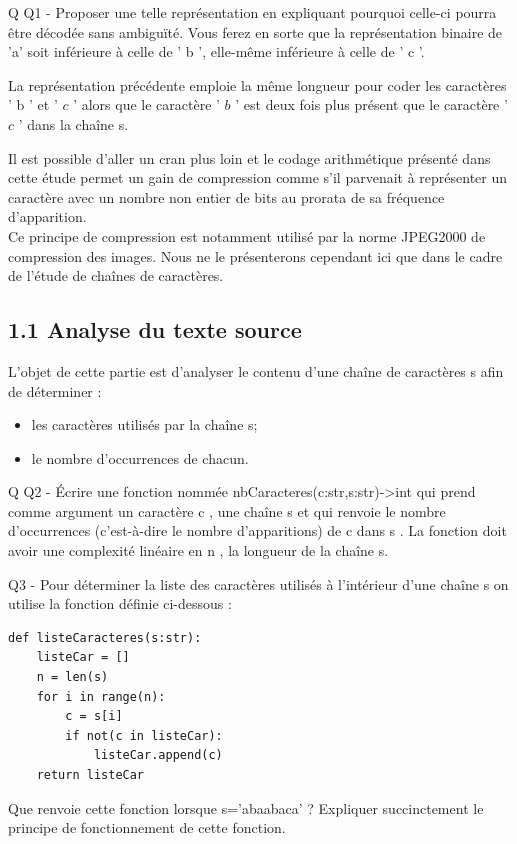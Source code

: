 \documentclass[10pt]{article}
\begin{document}
Q Q1 - Proposer une telle représentation en expliquant pourquoi celle-ci pourra être décodée sans ambiguïté. Vous ferez en sorte que la représentation binaire de 'a' soit inférieure à celle de ' b ', elle-même inférieure à celle de ' c '.

La représentation précédente emploie la même longueur pour coder les caractères ' b ' et ' $c$ ' alors que le caractère ' $b$ ' est deux fois plus présent que le caractère ' $c$ ' dans la chaîne s.

Il est possible d'aller un cran plus loin et le codage arithmétique présenté dans cette étude permet un gain de compression comme s'il parvenait à représenter un caractère avec un nombre non entier de bits au prorata de sa fréquence d'apparition.\\
Ce principe de compression est notamment utilisé par la norme JPEG2000 de compression des images. Nous ne le présenterons cependant ici que dans le cadre de l'étude de chaînes de caractères.

\subsection*{1.1 Analyse du texte source}
L'objet de cette partie est d'analyser le contenu d'une chaîne de caractères s afin de déterminer :

\begin{itemize}
  \item les caractères utilisés par la chaîne s;
  \item le nombre d'occurrences de chacun.
\end{itemize}

Q Q2 - Écrire une fonction nommée nbCaracteres(c:str,s:str)->int qui prend comme argument un caractère c , une chaîne s et qui renvoie le nombre d'occurrences (c'est-à-dire le nombre d'apparitions) de c dans s . La fonction doit avoir une complexité linéaire en n , la longueur de la chaîne s.

Q3 - Pour déterminer la liste des caractères utilisés à l'intérieur d'une chaîne s on utilise la fonction définie ci-dessous :

\begin{verbatim}
def listeCaracteres(s:str):
    listeCar = []
    n = len(s)
    for i in range(n):
        c = s[i]
        if not(c in listeCar):
            listeCar.append(c)
    return listeCar
\end{verbatim}

Que renvoie cette fonction lorsque s='abaabaca' ? Expliquer succinctement le principe de fonctionnement de cette fonction.
\end{document}
